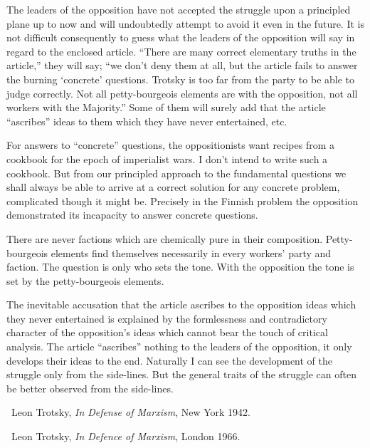 

The leaders of the opposition have not accepted the struggle upon a principled plane up to now and will undoubtedly attempt to avoid it even in the future. It is not difficult consequently to guess what the leaders of the opposition will say in regard to the enclosed article. “There are many correct elementary truths in the article,” they will say; “we don’t deny them at all, but the article fails to answer the burning ‘concrete’ questions. Trotsky is too far from the party to be able to judge correctly. Not all petty-bourgeois elements are with the opposition, not all workers with the Majority.” Some of them will surely add that the article “ascribes” ideas to them which they have never entertained, etc.

For answers to “concrete” questions, the oppositionists want recipes from a cookbook for the epoch of imperialist wars. I don’t intend to write such a cookbook. But from our principled approach to the fundamental questions we shall always be able to arrive at a correct solution for any concrete problem, complicated though it might be. Precisely in the Finnish problem the opposition demonstrated its incapacity to answer concrete questions.

There are never factions which are chemically pure in their composition. Petty-bourgeois elements find themselves necessarily in every workers’ party and faction. The question is only who sets the tone. With the opposition the tone is set by the petty-bourgeois elements.

The inevitable accusation that the article ascribes to the opposition ideas which they never entertained is explained by the formlessness and contradictory character of the opposition’s ideas which cannot bear the touch of critical analysis. The article “ascribes” nothing to the leaders of the opposition, it only develops their ideas to the end. Naturally I can see the development of the struggle only from the side-lines. But the general traits of the struggle can often be better observed from the side-lines.


\begin{letterinfo}
	\firstpublished\ Leon Trotsky, \emph{In Defense of Marxism}, New York 1942.
	
	\checkedagainst\ Leon Trotsky, \emph{In Defence of Marxism}, London 1966.
	
	\footnoteslatter
\end{letterinfo}